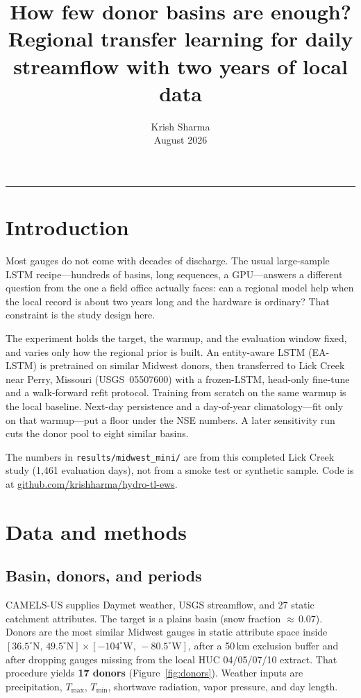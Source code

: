 \documentclass[11pt,letterpaper]{article}
\title{%
  \textbf{\textcolor{accentdark}{How few donor basins are enough?}}\\[0.25em]
  \large Regional transfer learning for daily streamflow with two years of local data
}
\author{Krish Sharma\\[0.15em]
  \small\textcolor{muted}{August 2026}}
\date{}
\newcommand{\repo}{\href{https://github.com/krishharma/hydro-tl-ews}{github.com/krishharma/hydro-tl-ews}}
\begin{document}
\maketitle
\vspace{0.2em}
{\color{accent}\rule{\linewidth}{1.2pt}}
\vspace{0.35em}

\section{Introduction}

Most gauges do not come with decades of discharge. The usual large-sample LSTM
recipe---hundreds of basins, long sequences, a GPU---answers a different
question from the one a field office actually faces: can a regional model help
when the local record is about two years long and the hardware is ordinary?
That constraint is the study design here.

The experiment holds the target, the warmup, and the evaluation window fixed,
and varies only how the regional prior is built. An entity-aware LSTM
(EA-LSTM) is pretrained on similar Midwest donors, then transferred to Lick
Creek near Perry, Missouri (USGS~05507600) with a frozen-LSTM, head-only
fine-tune and a walk-forward refit protocol. Training from scratch on the same
warmup is the local baseline. Next-day persistence and a day-of-year
climatology---fit only on that warmup---put a floor under the NSE numbers. A
later sensitivity run cuts the donor pool to eight similar basins.

The numbers in \texttt{results/midwest\_mini/} are from this completed Lick
Creek study (1{,}461 evaluation days), not from a smoke test or synthetic
sample. Code is at \repo.

\section{Data and methods}

\subsection{Basin, donors, and periods}

CAMELS-US supplies Daymet weather, USGS streamflow, and 27 static catchment
attributes. The target is a plains basin (snow fraction ${\approx}\,0.07$).
Donors are the most similar Midwest gauges in static attribute space inside
$[36.5^\circ\mathrm{N},\,49.5^\circ\mathrm{N}]\times[-104^\circ\mathrm{W},\,-80.5^\circ\mathrm{W}]$,
after a 50\,km exclusion buffer and after dropping gauges missing from the
local HUC 04/05/07/10 extract. That procedure yields \textbf{17 donors}
(Figure~\ref{fig:donors}). Weather inputs are precipitation, $T_\mathrm{max}$,
$T_\mathrm{min}$, shortwave radiation, vapor pressure, and day length.
\end{document}
